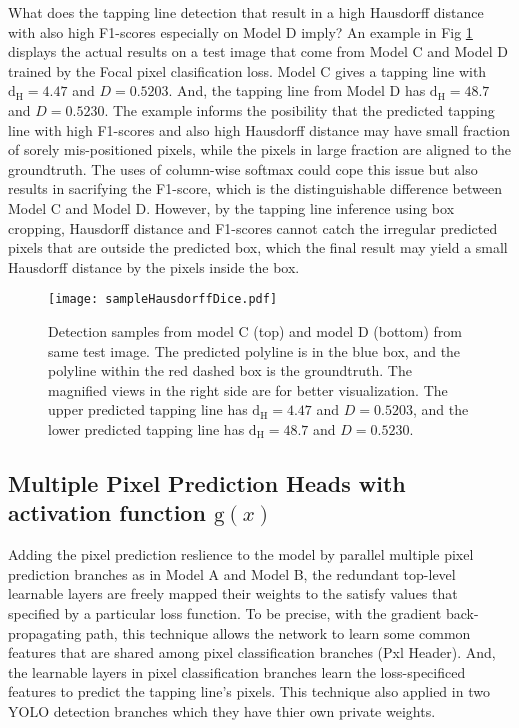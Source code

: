 \documentclass[default,pdflatex,iicol]{sn-jnl}%
\begin{document}
What does the tapping line detection that result in a high Hausdorff distance with also high F1-scores especially on Model D imply? An example in Fig \ref{fig-sampleHausdorffDice} displays the actual results on a test image that come from Model C and Model D trained by the Focal pixel clasification loss. Model C gives a tapping line with $\mathrm{d_{H}}=4.47$ and $D=0.5203$. And, the tapping line from Model D has $\mathrm{d_{H}}=48.7$ and $D=0.5230$. The example informs the posibility that the predicted tapping line with high F1-scores and also high Hausdorff distance may have small fraction of sorely mis-positioned pixels, while the pixels in large fraction are aligned to the groundtruth. The uses of column-wise softmax could cope this issue but also results in sacrifying the F1-score, which is the distinguishable difference between Model C and Model D. However, by the tapping line inference using box cropping, Hausdorff distance and F1-scores cannot catch the irregular predicted pixels that are outside the predicted box, which the final result may yield a small Hausdorff distance by the pixels inside the box.

\begin{figure}[!h]%
\centering
\texttt{[image: sampleHausdorffDice.pdf]}
\caption{Detection samples from model C (top) and model D (bottom) from same test image. The predicted polyline is in the blue box, and the polyline within the red dashed box is the groundtruth. The magnified views in the right side are for better visualization. The upper predicted tapping line has $\mathrm{d_{H}}=4.47$ and $D=0.5203$, and the lower predicted tapping line has $\mathrm{d_{H}}=48.7$ and $D=0.5230$.}\label{fig-sampleHausdorffDice}
\end{figure}

\subsection{Multiple Pixel Prediction Heads with activation function $\mathrm{g}(x)$}
Adding the pixel prediction reslience to the model by parallel multiple pixel prediction branches as in Model A and Model B, the redundant top-level learnable layers are freely mapped their weights to the satisfy values that specified by a particular loss function. To be precise, with the gradient back-propagating path, this technique allows the network to learn some common features that are shared among pixel classification branches (Pxl Header). And, the learnable layers in pixel classification branches learn the loss-specificed features to predict the tapping line's pixels. This technique also applied in two YOLO detection branches which they have thier own private weights.
\end{document}
